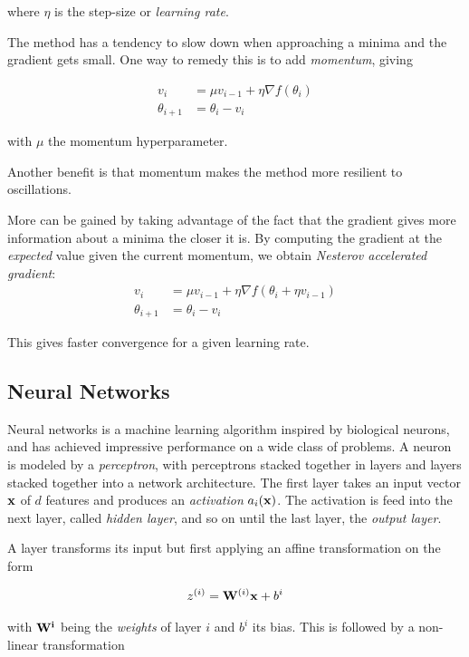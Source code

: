 where \(\eta\) is the step-size or \textit{learning rate}.

The method has a tendency to slow down when approaching a minima and the
gradient gets small. One way to remedy this is to add \textit{momentum}, giving

\begin{align*}
  v_{i} &= \mu v_{i-1} + \eta\nabla f(\theta_{i})\\
  \theta_{i+1} &= \theta_{i} - v_{i}
\end{align*}

with \(\mu\) the momentum hyperparameter.

Another benefit is that momentum makes the method more resilient to oscillations.

More can be gained by taking advantage of the fact that the gradient gives more
information about a minima the closer it is. By computing the gradient at the
\textit{expected} value given the current momentum, we obtain \textit{Nesterov
  accelerated gradient}:
\begin{align*}
  v_{i} &= \mu v_{i-1} + \eta\nabla f(\theta_{i} + \eta v_{i-1})\\
  \theta_{i+1} &= \theta_{i} - v_{i}
\end{align*}

This gives faster convergence for a given learning rate.

\subsection{Neural Networks}\label{subsec:neuralnet}

Neural networks is a machine learning algorithm inspired by biological neurons,
and has achieved impressive performance on a wide class of problems. A neuron is
modeled by a \textit{perceptron}, with perceptrons stacked together in layers
and layers stacked together into a network architecture. The first layer takes
an input vector \(\vb{x}\) of \(d\) features and produces an \textit{activation}
\(a_{i}(\vb{x})\). The activation is feed into the next layer, called
\textit{hidden layer}, and so on until
the last layer, the \textit{output layer}.

A layer transforms its input but first applying an
affine transformation on the form

\begin{align*}
  z^{(i)} = \vb{W}^{(i)}\vb{x} + b^{i}
\end{align*}

with \(\vb{W^{i}}\) being the \textit{weights} of layer \(i\) and \(b^{i}\) its
bias. This is followed by a non-linear transformation

